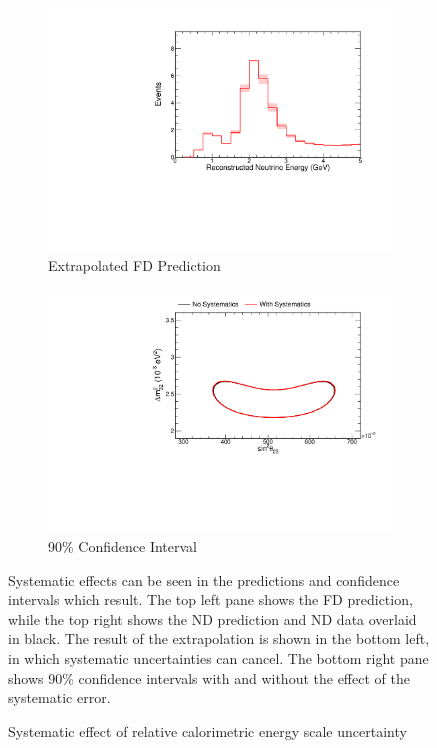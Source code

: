 {\begin{figure}
\begin{center}
\begin{subfigure}[c]{0.49\textwidth}
\includegraphics[width=\textwidth]{figures/systs/prediction/fd_extrap_prediction_calScaleRel.pdf}
\caption*{Extrapolated FD Prediction}
\end{subfigure}
\begin{subfigure}[c]{0.49\textwidth}
\includegraphics[width=\textwidth]{figures/systs/prediction/fd_extrap_contour_calScaleRel.pdf}
\caption*{90\% Confidence Interval}
\end{subfigure}
\end{center}
\caption{Systematic effect of relative calorimetric energy scale uncertainty}{
Systematic effects can be seen in the predictions and confidence intervals
which result.
The top left pane shows the FD prediction, while the top right shows the
ND prediction and ND data overlaid in black.
The result of the extrapolation is shown in the bottom left, in which
systematic uncertainties can cancel.
The bottom right pane shows 90\% confidence intervals with and without
the effect of the systematic error.}
\label{syst_fig_calScaleRel}


\end{figure}}

